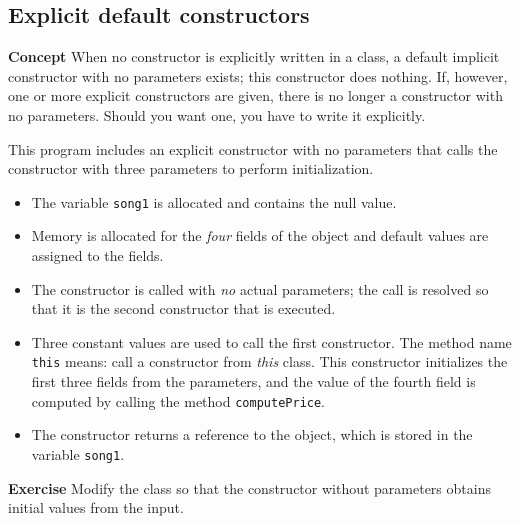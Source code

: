 \subsection{Explicit default constructors}\label{con.05}

\textbf{Concept} When no constructor is explicitly written in a class, a default implicit constructor with no parameters exists; this constructor does nothing. If, however, one or more explicit constructors are given, there is no longer a constructor with no parameters.
Should you want one, you have to write it explicitly.


This program includes an explicit constructor with no parameters that calls the constructor with three parameters to perform initialization.

\begin{itemize}
\item The variable \texttt{song1} is allocated and contains the null value.
\item Memory is allocated for the \emph{four} fields of the object and default values are assigned to the fields. 
\item The constructor is called with \emph{no} actual parameters; the call is resolved so that it is the second constructor that is executed. 
\item Three constant values are used to call the first constructor. The method name \texttt{this} means: call a constructor from \emph{this} class. 
This constructor initializes the first three fields from the parameters, and the value of the fourth field is computed by calling the method \texttt{computePrice}.
\item The constructor returns a reference to the object, which is stored in the variable \texttt{song1}.
\end{itemize}

\textbf{Exercise}  Modify the class so that the constructor without parameters 
obtains initial values from the input.
